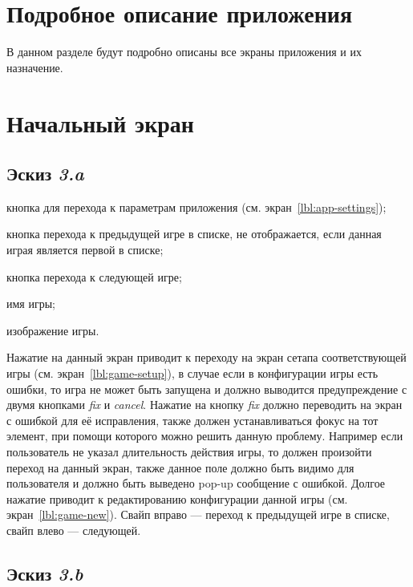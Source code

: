 \section{Подробное описание приложения}

В данном разделе будут подробно описаны все экраны приложения и их назначение.

\section{Начальный экран}\label{lbl:start}

\subsection{Эскиз \emph{3.a}}

\begin{enumerate*}
    \item кнопка для перехода к параметрам приложения (см. экран~\ref{lbl:app-settings});
    \item кнопка перехода к предыдущей игре в списке, не отображается, если данная играя является первой в списке;
    \item кнопка перехода к следующей игре;
    \item имя игры;
    \item изображение игры.
\end{enumerate*}
Нажатие на данный экран приводит к переходу на экран сетапа соответствующей игры (см. экран~\ref{lbl:game-setup}), в случае если в конфигурации игры есть ошибки, то игра не может быть запущена и должно выводится предупреждение с двумя кнопками \emph{fix} и \emph{cancel}. Нажатие на кнопку \emph{fix} должно переводить на экран с ошибкой для её исправления, также должен устанавливаться фокус на тот элемент, при помощи которого можно решить данную проблему. Например если пользователь не указал длительность действия игры, то должен произойти переход на данный экран, также данное поле должно быть видимо для пользователя и должно быть выведено pop-up сообщение с ошибкой. Долгое нажатие приводит к редактированию конфигурации данной игры (см. экран~\ref{lbl:game-new}). Свайп вправо --- переход к предыдущей игре в списке, свайп влево --- следующей.

\subsection{Эскиз \emph{3.b}}

